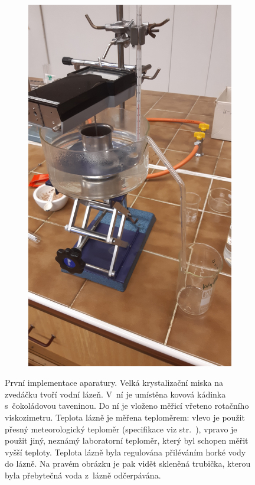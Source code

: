\documentclass[12pt]{article}
\begin{document}
\begin{figure}
    \begin{subfigure}[b]{.5\textwidth}
        \includegraphics[angle = 270, width = \textwidth]{figures/aparatura_2.jpg}
    \end{subfigure}
    \caption{První implementace aparatury. Velká krystalizační miska na zvedáčku tvoří vodní lázeň. V~ní je umístěna kovová kádinka s~čokoládovou taveninou. Do ní je vloženo měřicí vřeteno rotačního viskozimetru. Teplota lázně je měřena teploměrem: vlevo je použit přesný meteorologický teploměr (specifikace viz str.~\pageref{sec:teploměr}), vpravo je použit jiný, neznámý laboratorní teploměr, který byl schopen měřit vyšší teploty. Teplota lázně byla regulována přiléváním horké vody do lázně. Na pravém obrázku je pak vidět skleněná trubička, kterou byla přebytečná voda z~lázně odčerpávána.}
    \label{fig:aparatura}
\end{figure}
\end{document}
